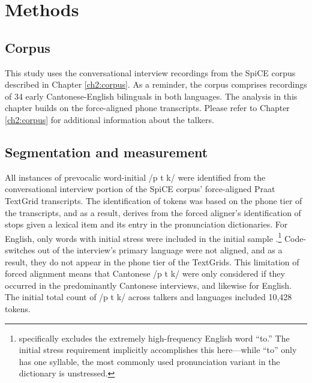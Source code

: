 
\section{Methods}

\subsection{Corpus}

This study uses the conversational interview recordings from the SpiCE corpus described in Chapter \ref{ch2:corpus}. As a reminder, the corpus comprises recordings of 34 early Cantonese-English bilinguals in both languages. The analysis in this chapter builds on the force-aligned phone transcripts. Please refer to Chapter \ref{ch2:corpus} for additional information about the talkers. 

\subsection{Segmentation and measurement}

All instances of prevocalic word-initial /p t k/ were identified from the conversational interview portion of the SpiCE corpus' force-aligned Praat TextGrid transcripts. The identification of tokens was based on the phone tier of the transcripts, and as a result, derives from the forced aligner's identification of stops given a lexical item and its entry in the pronunciation dictionaries. For English, only words with initial stress were included in the initial sample \citep{lisker_1967_some}.\footnote{\citet{chodroff_2017_structure} specifically excludes the extremely high-frequency English word ``to.'' The initial stress requirement implicitly accomplishes this here---while ``to'' only has one syllable, the most commonly used pronunciation variant in the dictionary is unstressed.} Code-switches out of the interview's primary language were not aligned, and as a result, they do not appear in the phone tier of the TextGrids. This limitation of forced alignment means that Cantonese /p t k/ were only considered if they occurred in the predominantly Cantonese interviews, and likewise for English. The initial total count of /p t k/ across talkers and languages included 10,428 tokens. 

